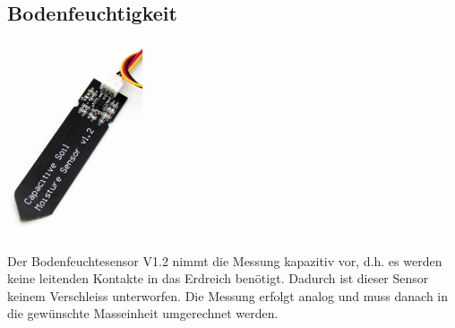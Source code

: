 \documentclass[
  12pt, %
  a4paper, %
  twoside, %
  openany, %
  numbers=noenddot, %
  BCOR=5mm, %
  parskip=half*, %
  thesis, %
]{bfhbook}
\newcommand{\compImgSize}{4cm}
\begin{document}
\subsection{Bodenfeuchtigkeit}\label{moistV1.2}
\begin{minipage}[t]{0.5\linewidth}
\includegraphics[width=\compImgSize, left, valign=t]{Bilder/Soil-2.jpg}%
\label{labelname}
\end{minipage}
\begin{minipage}[t]{0.5\linewidth}
Der Bodenfeuchtesensor V1.2 \footnotemark nimmt die Messung kapazitiv vor, d.h. es werden keine leitenden Kontakte in das Erdreich benötigt. Dadurch ist dieser Sensor keinem Verschleiss unterworfen. Die Messung erfolgt analog und muss danach in die gewünschte Masseinheit umgerechnet werden.
\end{minipage}
 
\end{document}
